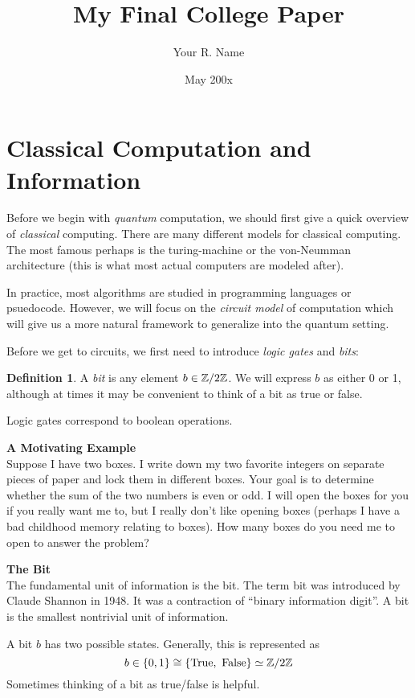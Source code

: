\documentclass[12pt,twoside]{reedthesis}
\title{My Final College Paper}
\author{Your R. Name}
\date{May 200x}
\theoremstyle{definition}\newtheorem{definition}{Definition}
\begin{document}

\section{Classical Computation and Information}
Before we begin with \emph{quantum} computation, we should first give a quick overview of \emph{classical} computing. There are many different models for classical computing. The most famous perhaps is the turing-machine or the von-Neumman architecture (this is what most actual computers are modeled after).


In practice, most algorithms are studied in programming languages or psuedocode. However, we will focus on the \emph{circuit model} of computation which will give us a more natural framework to generalize into the quantum setting.

Before we get to circuits, we first need to introduce \emph{logic gates} and \emph{bits}:


\begin{definition}
    A \emph{bit} is any element $b \in \mathbb{Z}/2\mathbb{Z}$. We will express $b$ as either 0 or 1, although at times it may be convenient to think of a bit as true or false.
\end{definition}

Logic gates correspond to boolean operations.

\vfill
\pagebreak




\textbf{A Motivating Example} \\
Suppose I have two boxes. I write down my two favorite integers on separate pieces of paper and lock them in different boxes. Your goal is to determine whether the sum of the two numbers is even or odd. I will open the boxes for you if you really want me to, but I really don't like opening boxes (perhaps I have a bad childhood memory relating to boxes). How many boxes do you need me to open to answer the problem?

\textbf{The Bit} \\
The fundamental unit of information is the bit. The term bit was introduced by Claude Shannon in 1948. It was a contraction of ``binary information digit''. A bit is the smallest nontrivial unit of information.

A bit $b$ has two possible states. Generally, this is represented as
\[
    b \in \{0, 1\} \cong \{\text{True},\ \text{False}\} \simeq \Z/2\Z
\]
Sometimes thinking of a bit as true/false is helpful.
\end{document}
